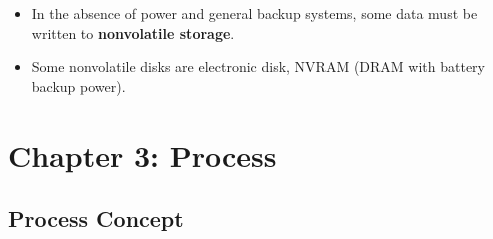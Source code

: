 \documentclass[10pt]{article}
\begin{document}
\begin{enumerate}
\begin{itemize}
		\bigbreak
		\bigbreak

		\item In the absence of power and general backup systems, some data must be written to \textbf{nonvolatile storage}.
		\item Some nonvolatile disks are electronic disk, NVRAM (DRAM with battery backup power).
	\end{itemize}

\end{enumerate}

\pagebreak
\section{Chapter 3: Process}

\subsection{Process Concept}
\end{document}
